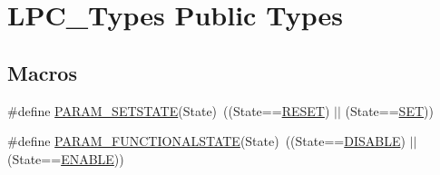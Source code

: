 \hypertarget{group___l_p_c___types___public___types}{}\section{L\+P\+C\+\_\+\+Types Public Types}
\label{group___l_p_c___types___public___types}
\subsection*{Macros}
\begin{DoxyCompactItemize}
\item 
\#define \hyperlink{group___l_p_c___types___public___types_gafb6827323e4c501477936a84bd733b4f}{P\+A\+R\+A\+M\+\_\+\+S\+E\+T\+S\+T\+A\+TE}(State)~((State==\hyperlink{group___l_p_c___types___public___types_gga89136caac2e14c55151f527ac02daaffa589b7d94a3d91d145720e2fed0eb3a05}{R\+E\+S\+ET}) $\vert$$\vert$ (State==\hyperlink{group___l_p_c___types___public___types_gga89136caac2e14c55151f527ac02daaffab44c8101cc294c074709ec1b14211792}{S\+ET}))
\item 
\#define \hyperlink{group___l_p_c___types___public___types_ga5475435ea985fe5abbf2048e87e3e682}{P\+A\+R\+A\+M\+\_\+\+F\+U\+N\+C\+T\+I\+O\+N\+A\+L\+S\+T\+A\+TE}(State)~((State==\hyperlink{group___l_p_c___types___public___types_ggac9a7e9a35d2513ec15c3b537aaa4fba1ad3a9df141be0ccf10389b640f492b26d}{D\+I\+S\+A\+B\+LE}) $\vert$$\vert$ (State==\hyperlink{group___l_p_c___types___public___types_ggac9a7e9a35d2513ec15c3b537aaa4fba1a7d46875fa3ebd2c34d2756950eda83bf}{E\+N\+A\+B\+LE}))
\end{DoxyCompactItemize}

